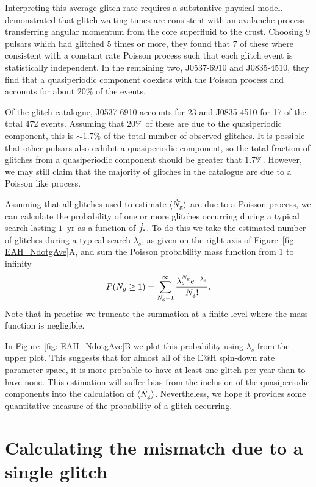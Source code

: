 \documentclass[../full_thesis/full_thesis.tex]{subfiles}
\begin{document}
Interpreting this average glitch rate requires a substantive physical
model. \citet{Melatos2008} demonstrated that glitch waiting times are consistent
with an avalanche process transferring angular momentum from the core superfluid
to the crust. Choosing 9 pulsars which had glitched 5 times or more, they found
that 7 of these where consistent with a constant rate Poisson process such that
each glitch event is statistically independent. In the remaining two, J0537-6910
and J0835-4510, they find that a quasiperiodic component coexists with the Poisson
process and accounts for about $20\%$ of the events.

Of the glitch catalogue, J0537-6910 accounts for 23 and J0835-4510 for 17 of
the total 472 events. Assuming that $20\%$ of these are due to the
quasiperiodic component, this is $\sim 1.7\%$ of the total number of observed glitches. It
is possible that other pulsars also exhibit a quasiperiodic component, so the
total fraction of glitches from a quasiperiodic component should be greater
that $1.7\%$. However, we may still claim that the majority of glitches in the
catalogue are due to a Poisson like process.

Assuming that all glitches used to estimate $\langle \dot{N}_{\textrm{g}}\rangle$ are due to a Poisson
process, we can calculate the probability of one or more glitches occurring during
a typical search lasting $1$~yr as a function of $\dot{f}_{\textrm{s}}$. To do this we take the
estimated number of glitches during a typical search
$\lambda_{s}$, as given on the right axis of Figure~\ref{fig: EAH_NdotgAve}A,
and sum the Poisson probability mass function from 1 to infinity
\begin{align}
P(N_{g} \ge 1) = \sum_{N_{\textrm{g}}=1}^{\infty}\frac{\lambda_{s}^{N_{\textrm{g}}}e^{-\lambda_{s}}}{N_{\textrm{g}}!}.
\end{align}
Note that in practise we truncate the summation at a finite level where the
mass function is negligible.

In Figure~\ref{fig: EAH_NdotgAve}B we plot this probability using $\lambda_{s}$
from the upper plot. This suggests that for almost all of the E@H spin-down
rate parameter space, it is more probable to have at least one glitch per year
than to have none. This estimation will suffer bias from the inclusion of the
quasiperiodic components into the calculation of $\langle \dot{N}_{\textrm{g}}\rangle$. Nevertheless, we
hope it provides some quantitative measure of the probability of a glitch
occurring.

\section{Calculating the mismatch due to a single glitch}
\label{sec: mismatch due to glitches}
\end{document}

